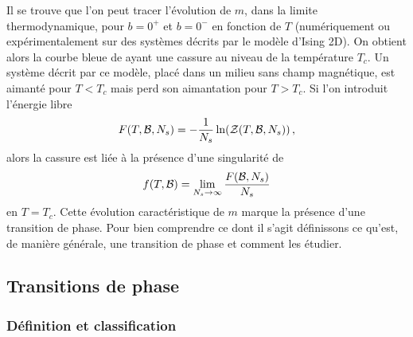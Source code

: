 \documentclass[10.5pt]{article}
\begin{document}
\begin{multicols*}{2}
\begin{figure}[H]
\begin{center}
\end{center}
\end{figure} 
\vspace*{-20pt}
Il se trouve que l'on peut tracer l'évolution de $m$, dans la limite thermodynamique, pour $b = 0^+$ et $b = 0^-$ en fonction de $T$ (numériquement ou expérimentalement sur des systèmes décrits par le modèle d'Ising 2D). On obtient alors la courbe bleue de  ayant une cassure au niveau de la température $T_c$.  Un système décrit par ce modèle, placé dans un milieu sans champ magnétique, est aimanté pour $T<T_c$ mais perd son aimantation pour $T>T_c$. Si l'on introduit l'énergie libre
\begin{equation}
F(T, \mathcal{B}, N_s) = -\frac{1}{N_s}\ln(\mathcal{Z}(T, \mathcal{B}, N_s))\, ,	
\end{equation}
alors la cassure est liée à la présence d'une singularité de 
\begin{equation}
f(T, \mathcal{B}) = \lim_{N_s \to \infty} \frac{F(\mathcal{B}, N_s)}{N_s}
\end{equation} 
en $T=T_c$.
Cette évolution caractéristique de $m$ marque la présence d'une transition de phase. Pour bien comprendre  ce dont il s'agit définissons ce qu'est, de manière générale, une transition de phase et comment les étudier. \\









\subsection{Transitions de phase}
\subsubsection{Définition et classification}


\end{multicols*}
\end{document}
